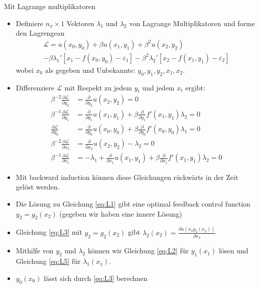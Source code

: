 \documentclass[smaller,compress]{beamer}  %
\begin{document}
\begin{frame}
  Mit Lagrange multiplikatoren
  \begin{itemize}
    \item Definiere $n_x \times 1$ Vektoren $\lambda_1$ und $\lambda_2$ von Lagrange Multiplikatoren und forme den Lagrengean
    \begin{multline}
      \mathcal{L} = u(x_0,y_0) + \beta u(x_1,y_1) + \beta^2 u(x_2,y_2) \\
      - \beta \lambda_1'\left[x_1 - f(x_0,y_0)-\varepsilon_1\right] - \beta^2 \lambda_2'\left[x_2 - f(x_1,y_1)-\varepsilon_2\right]
    \end{multline}
    wobei $x_0$ als gegeben und Unbekannte: $y_0,y_1,y_2,x_1,x_2$.
    \item Differenziere $\mathcal{L}$ mit Respekt zu jedem $y_t$ und jedem $x_t$ ergibt:
    \begin{align}
      \beta^{-2}\frac{\partial \mathcal{L}}{\partial y_2} &= \frac{\partial}{\partial y_2} u(x_2,y_2) = 0\label{eq:L1}\\
      \beta^{-1}\frac{\partial \mathcal{L}}{\partial y_1} &= \frac{\partial}{\partial y_1} u(x_1,y_1) + \beta \frac{\partial}{\partial y_1} f'(x_1,y_1)\lambda_2 = 0\label{eq:L2}\\
      \frac{\partial \mathcal{L}}{\partial y_0} &= \frac{\partial}{\partial y_0} u(x_0,y_0) + \beta \frac{\partial}{\partial y_0} f'(x_0,y_0)\lambda_1 = 0\label{eq:L3}\\
      \beta^{-2}\frac{\partial \mathcal{L}}{\partial x_2} &= \frac{\partial}{\partial x_2} u(x_2,y_2) - \lambda_2 = 0\label{eq:L4}\\
      \beta^{-1}\frac{\partial \mathcal{L}}{\partial x_1} &= -\lambda_1 + \frac{\partial}{\partial x_1} u(x_1,y_1) + \beta \frac{\partial}{\partial x_1} f'(x_1,y_1)\lambda_2 = 0\label{eq:L5}
    \end{align}
  \end{itemize}
\end{frame}

\begin{frame}
  \begin{itemize}
    \item Mit backward induction können diese Gleichungen rückwärts in der Zeit gelöst werden.
    \item Die Lösung zu Gleichung \eqref{eq:L1} gibt eine optimal feedback control function $y_2 = g_2(x_2)$ (gegeben wir haben eine innere Lösung)
    \item Gleichung \eqref{eq:L3} mit $y_2 = g_2(x_2)$ gibt $\lambda_2(x_2) = \frac{\partial u(x_2 g_2(x_2))}{\partial x_2}$
    \item Mithilfe von $y_2$ und $\lambda_2$ können wir Gleichung \eqref{eq:L2} für $y_1(x_1)$ lösen und Gleichung \eqref{eq:L5} für $\lambda_1(x_1)$.
    \item $y_0(x_0)$ lässt sich durch \eqref{eq:L3} berechnen
  \end{itemize}
\end{frame}
\end{document}
